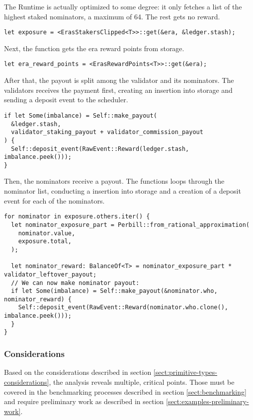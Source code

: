 \documentclass[11pt,a4paper]{article}
\begin{document}
The Runtime is actually optimized to some degree: it only fetches a list of the
highest staked nominators, a maximum of 64. The rest gets no reward.

\begin{verbatim}
let exposure = <ErasStakersClipped<T>>::get(&era, &ledger.stash);
\end{verbatim}

Next, the function gets the era reward points from storage.

\begin{verbatim}
let era_reward_points = <ErasRewardPoints<T>>::get(&era);
\end{verbatim}

After that, the payout is split among the validator and its nominators. The
validators receives the payment first, creating an insertion into storage and
sending a deposit event to the scheduler.

\begin{verbatim}
if let Some(imbalance) = Self::make_payout(
  &ledger.stash,
  validator_staking_payout + validator_commission_payout
) {
  Self::deposit_event(RawEvent::Reward(ledger.stash, imbalance.peek()));
}
\end{verbatim}

Then, the nominators receive a payout. The functions loops through the nominator
list, conducting a insertion into storage and a creation of a deposit event for
each of the nominators.

\begin{verbatim}
for nominator in exposure.others.iter() {
  let nominator_exposure_part = Perbill::from_rational_approximation(
    nominator.value,
    exposure.total,
  );

  let nominator_reward: BalanceOf<T> = nominator_exposure_part * validator_leftover_payout;
  // We can now make nominator payout:
  if let Some(imbalance) = Self::make_payout(&nominator.who, nominator_reward) {
    Self::deposit_event(RawEvent::Reward(nominator.who.clone(), imbalance.peek()));
  }
}
\end{verbatim}

\subsubsection*{Considerations}

Based on the considerations described in section
\ref{sect:primitive-types-considerations}, the analysis reveals multiple,
critical points. Those must be covered in the benchmarking processes described
in section \ref{sect:benchmarking} and require preliminary work as described in
section \ref{sect:examples-preliminary-work}.
\newline
\end{document}
